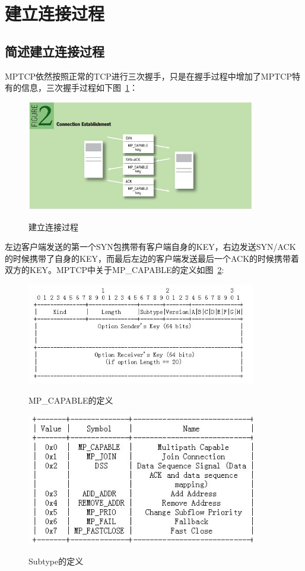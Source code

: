 \section{建立连接过程}
\subsection{简述建立连接过程}
MPTCP依然按照正常的TCP进行三次握手，只是在握手过程中增加了MPTCP特有的信息，三次握手过程如下图~\ref{label:建立连接过程}：
\begin{figure}[H]
  \centering
  \includegraphics[width=10cm]{dias/Connection_Establishment.jpg}\\
  \caption{建立连接过程}
  \label{label:建立连接过程}
\end{figure}
左边客户端发送的第一个SYN包携带有客户端自身的KEY，右边发送SYN/ACK的时候携带了自身的KEY，而最后左边的客户端发送最后一个ACK的时候携带着双方的KEY。MPTCP中关于MP\_CAPABLE的定义如图~\ref{label:MPCAPABLE的定义}:
\begin{figure}[H]
  \centering
  \includegraphics[width=10cm]{dias/Definition_of_MP_CAPABLE.jpg}\\
  \caption{MP\_CAPABLE的定义}
  \label{label:MPCAPABLE的定义}
\end{figure}

\begin{figure}[H]
  \centering
  \includegraphics[width=10cm]{dias/Definition_of_Subtype.jpg}\\
  \caption{Subtype的定义}
  \label{fig:Subtype的定义}
\end{figure}

